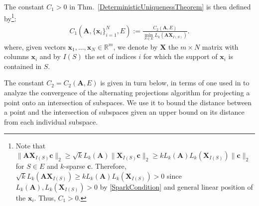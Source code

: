 \documentclass[9pt,twocolumn]{pnas-new}
\begin{document}
The constant $C_1 > 0$ in Thm.~\ref{DeterministicUniquenessTheorem} is then defined by\footnote{Note that $\|\mathbf{AX}_{I(S)}\mathbf{c}\|_2 \geq \sqrt{k} L_k(\mathbf{A})\|\mathbf{X}_{I(S)}\mathbf{c}\|_2 \geq k L_k(\mathbf{A}) L_k(\mathbf{X}_{I(S)})\|\mathbf{c}\|_2$ for $S \in E$ and $k$-sparse $\mathbf{c}$. Therefore, $\sqrt{k} L_k(\mathbf{AX}_{I(S)}) \geq k L_k(\mathbf{A}) L_k(\mathbf{X}_{I(S)}) > 0$ since $L_k(\mathbf{A}), L_k(\mathbf{X}_{I(S)}) > 0$ by \eqref{SparkCondition} and general linear position of the $\mathbf{x}_i$.  Thus, $C_1 > 0$.}:
\begin{align}\label{Cdef1}
C_1(\mathbf{A}, \{\mathbf{x}_i\}_{i=1}^N, E) := \frac{ C_2(\mathbf{A}, E) } { \min_{S \in E} L_k(\mathbf{AX}_{I(S)}) }.
\end{align}
where, given vectors $\mathbf{x}_1, \ldots, \mathbf{x}_N \in \mathbb{R}^m$, we denote by $\mathbf{X}$ the $m \times N$ matrix with columns $\mathbf{x}_i$ and by $I(S)$ the set of indices $i$ for which the support of $\mathbf{x}_i$ is contained in $S$. %

The constant $C_2 = C_2(\mathbf{A}, E)$ is given in turn below, in terms of one used in \cite{Deutsch12} to analyze the convergence of the alternating projections algorithm for projecting a point onto an intersection of subspaces. 
We use it to bound the distance between a point and the intersection of subspaces given an upper bound on its distance from each individual subspace.
\end{document}

